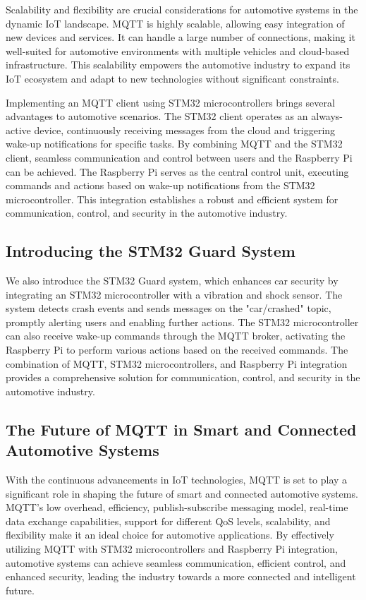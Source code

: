 \documentclass[
12pt,
oneside, 
onehalfspacing, 
nolistspacing, 
parskip, 
chapterinoneline, 
]{AASTCOMPUTER}
\begin{document}
Scalability and flexibility are crucial considerations for automotive systems in the dynamic IoT landscape. MQTT is highly scalable, allowing easy integration of new devices and services. It can handle a large number of connections, making it well-suited for automotive environments with multiple vehicles and cloud-based infrastructure. This scalability empowers the automotive industry to expand its IoT ecosystem and adapt to new technologies without significant constraints.

Implementing an MQTT client using STM32 microcontrollers brings several advantages to automotive scenarios. The STM32 client operates as an always-active device, continuously receiving messages from the cloud and triggering wake-up notifications for specific tasks. By combining MQTT and the STM32 client, seamless communication and control between users and the Raspberry Pi can be achieved. The Raspberry Pi serves as the central control unit, executing commands and actions based on wake-up notifications from the STM32 microcontroller. This integration establishes a robust and efficient system for communication, control, and security in the automotive industry.

\subsection{Introducing the STM32 Guard System}
We also introduce the STM32 Guard system, which enhances car security by integrating an STM32 microcontroller with a vibration and shock sensor. The system detects crash events and sends messages on the "car/crashed" topic, promptly alerting users and enabling further actions. The STM32 microcontroller can also receive wake-up commands through the MQTT broker, activating the Raspberry Pi to perform various actions based on the received commands. The combination of MQTT, STM32 microcontrollers, and Raspberry Pi integration provides a comprehensive solution for communication, control, and security in the automotive industry.

\subsection{The Future of MQTT in Smart and Connected Automotive Systems}
With the continuous advancements in IoT technologies, MQTT is set to play a significant role in shaping the future of smart and connected automotive systems. MQTT's low overhead, efficiency, publish-subscribe messaging model, real-time data exchange capabilities, support for different QoS levels, scalability, and flexibility make it an ideal choice for automotive applications. By effectively utilizing MQTT with STM32 microcontrollers and Raspberry Pi integration, automotive systems can achieve seamless communication, efficient control, and enhanced security, leading the industry towards a more connected and intelligent future.
\end{document}
